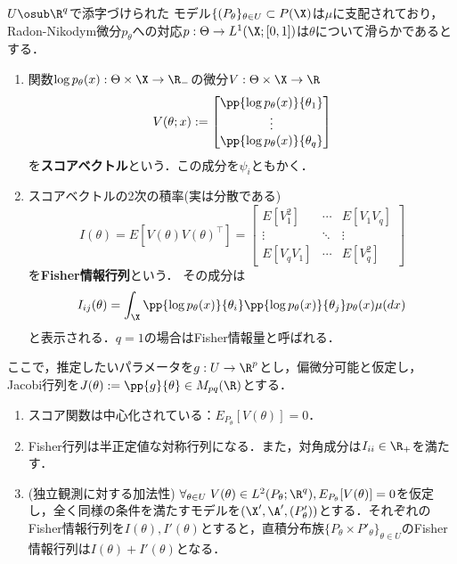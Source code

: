 \documentclass[uplatex,dvipdfmx]{jsreport}
\begin{document}
\begin{model}
    $U\osub\R^q$で添字づけられた
    モデル$\{(P_\theta\}_{\theta\in U}\subset P(\X)$は$\mu$に支配されており，Radon-Nikodym微分$p_\theta$への対応$p:\Theta\to L^1(\X;[0,1])$は$\theta$について滑らかであるとする．
    \begin{enumerate}
        \item 関数$\log p_\theta(x):\Theta\times\X\to\R_-$の微分$V:\Theta\times\X\to\R$
        \[V(\theta;x):=\begin{bmatrix}\pp{\log p_\theta(x)}{\theta_1}\\\vdots\\\pp{\log p_\theta(x)}{\theta_q}\end{bmatrix}\]
        を\textbf{スコアベクトル}という．この成分を$\psi_i$ともかく．
        \item スコアベクトルの2次の積率(実は分散である)
        \[I(\theta)=E[V(\theta)V(\theta)^\top]=\begin{bmatrix}E[V_1^2]&\cdots&E[V_1V_q]\\\vdots&\ddots&\vdots\\E[V_qV_1]&\cdots&E[V_q^2]\end{bmatrix}\]
        を\textbf{Fisher情報行列}という．
        その成分は
        \[I_{ij}(\theta)=\int_\X\pp{\log p_\theta(x)}{\theta_i}\pp{\log p_\theta(x)}{\theta_j}p_\theta(x)\mu(dx)\]
        と表示される．$q=1$の場合はFisher情報量と呼ばれる．
    \end{enumerate}
    ここで，推定したいパラメータを$g:U\to\R^p$とし，偏微分可能と仮定し，Jacobi行列を$J(\theta):=\pp{g}{\theta}\in M_{pq}(\R)$とする．
\end{model}

\begin{proposition}\mbox{}
    \begin{enumerate}
        \item スコア関数は中心化されている：$E_{P_\theta}[V(\theta)]=0$．
        \item Fisher行列は半正定値な対称行列になる．また，対角成分は$I_{ii}\in\R_+$を満たす．
        \item (独立観測に対する加法性) $\forall_{\theta\in U}\;V(\theta)\in L^2(P_\theta;\R^q),E_{P_\theta}[V(\theta)]=0$を仮定し，全く同様の条件を満たすモデルを$(\X',\A',(P'_\theta))$とする．それぞれのFisher情報行列を$I(\theta),I'(\theta)$とすると，直積分布族$\{P_\theta\times P'_\theta\}_{\theta\in U}$のFisher情報行列は$I(\theta)+I'(\theta)$となる．
    \end{enumerate}
\end{proposition}
\end{document}
